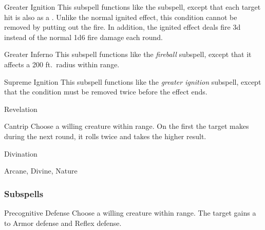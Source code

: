 \begin{ability}[\nth{6}]{Greater Ignition}
This subspell functions like the  subspell, except that each target hit is also  as a .
Unlike the normal ignited effect, this condition cannot be removed by putting out the fire.
In addition, the ignited effect deals fire  \minus3d instead of the normal 1d6 fire damage each round.
\end{ability}
\vspace{0.25em}


\begin{ability}[\nth{9}]{Greater Inferno}
This subspell functions like the \textit{fireball} subspell, except that it affects a 200 ft.\ radius within \rnglong range.
\end{ability}
\vspace{0.25em}


\begin{ability}[\nth{9}]{Supreme Ignition}
This subspell functions like the \textit{greater ignition} subspell, except that the condition must be removed twice before the effect ends.
\end{ability}
\vspace{0.25em}

\newpage
\begin{spellsection}{Revelation}

\begin{spellheader}
\end{spellheader}


\begin{ability}{Cantrip}
Choose a willing creature within \rngclose range.
On the first  the target makes during the next round, it rolls twice and takes the higher result.
\end{ability}




 Divination

 Arcane, Divine, Nature
\end{spellsection}


\subsubsection{Subspells}


\begin{ability}[\nth{1}]{Precognitive Defense}
Choose a willing creature within \rngclose range.
The target gains a   to Armor defense and Reflex defense.
\end{ability}
\vspace{0.25em}


